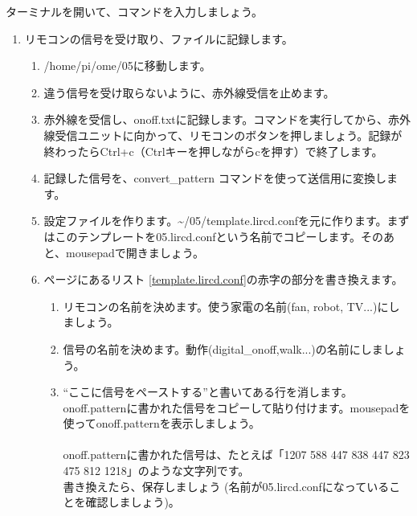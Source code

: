 \begin{tcolorbox}[title=\useOmetoi]
ターミナルを開いて、コマンドを入力しましょう。
\begin{enumerate}
\item リモコンの信号を受け取り、ファイルに記録します。
 \begin{enumerate}[1]
  \item /home/pi/ome/05に移動します。\\ 
  \item 違う信号を受け取らないように、赤外線受信を止めます。 \\ 
  \item 赤外線を受信し、onoff.txtに記録します。コマンドを実行してから、赤外線受信ユニットに向かって、リモコンのボタンを押しましょう。記録が終わったらCtrl+c（Ctrlキーを押しながらcを押す）で終了します。\\ 
  \item 記録した信号を、convert\_pattern コマンドを使って送信用に変換します。\\ 
  \item 設定ファイルを作ります。\textasciitilde /05/template.lircd.confを元に作ります。まずはこのテンプレートを05.lircd.confという名前でコピーします。そのあと、mousepadで開きましょう。\\ 
  \item \pageref{template.lircd.conf}ページにあるリスト \ref{template.lircd.conf}の赤字の部分を書き換えます。
  \begin{enumerate}[(1)]
    \item リモコンの名前を決めます。使う家電の名前(fan, robot, TV...)にしましょう。
    \item 信号の名前を決めます。動作(digital\_onoff,walk...)の名前にしましょう。
    \item “ここに信号をペーストする”と書いてある行を消します。onoff.patternに書かれた信号をコピーして貼り付けます。mousepadを使ってonoff.patternを表示しましょう。\\ 
\\onoff.patternに書かれた信号は、たとえば「1207 588 447 838 447 823 475 812 1218」のような文字列です。\\書き換えたら、保存しましょう (名前が05.lircd.confになっていることを確認しましょう)。
  \end{enumerate}

\end{enumerate}
\end{enumerate}
\end{tcolorbox}
